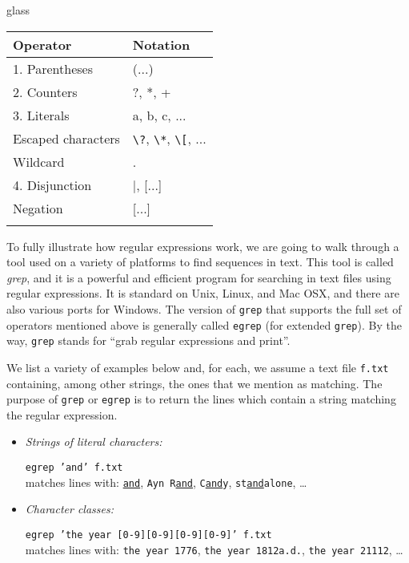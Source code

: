 \begin{tblsfilledsymbol}{}{glass}
\begin{underthehood}
\begin{table}[H]
\begin{tabular}{ll}
\lsptoprule
Operator & Notation \\\midrule
1. Parentheses & (...) \\
2. Counters & ?, *, + \\
3. Literals & a, b, c, ... \\
\quad Escaped characters & \verb.\?., \verb.\*., \verb.\[., ... \\
\quad Wildcard & . \\
4. Disjunction & $|$, [...] \\
\quad Negation & [\A...]\\
\lspbottomrule
\end{tabular}
\end{table}


To fully illustrate how regular expressions work, we are going to walk
through a tool used on a variety of platforms to find sequences in
text.  This tool is called \emph{grep}, and it is a powerful and
efficient program for searching in text files using regular
expressions.  It is standard on Unix, Linux, and Mac OSX, and there
 are also various ports for Windows.  The version of \texttt{grep} that
supports the full set of operators mentioned above is generally called
\texttt{egrep} (for extended \texttt{grep}).  By the way,
\texttt{grep} stands for ``grab regular expressions and print''.

  
We list a variety of examples below and, for each, we assume a text
file \texttt{f.txt} containing, among other strings, the ones that we
mention as matching.  The purpose of \texttt{grep} or \texttt{egrep}
is to return the lines which contain a string matching the regular
expression.

\begin{itemize}
  \item \emph{Strings of literal characters:}
    
  \texttt{egrep 'and' f.txt}\\[1ex]
  matches lines with:
  \texttt{\uline{and}}, \texttt{Ayn R\uline{and}},
  \texttt{C\uline{and}y}, \texttt{st\uline{and}alone}, \ldots

\item \emph{Character classes:}    

    \texttt{egrep 'the year [0-9][0-9][0-9][0-9]' f.txt}\\[1ex]
    matches lines with:
    \texttt{the year 1776}, \texttt{the year 1812a.d.},
    \texttt{the year 21112}, \ldots


\end{itemize}
\end{underthehood}
\end{tblsfilledsymbol}
